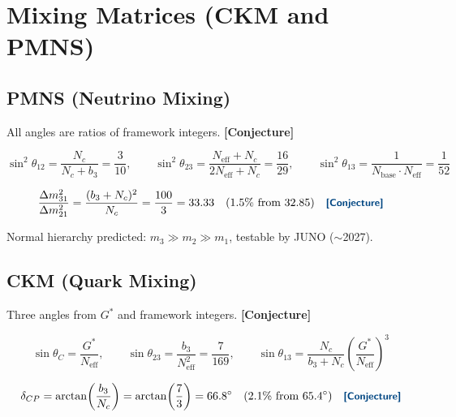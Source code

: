 \documentclass[12pt]{article}
\theoremstyle{definition}
\theoremstyle{remark}
\newcommand{\epi}[1]{\textnormal{{\small\sffamily\bfseries\color{ftdblue}[#1]}}}
\begin{document}
\section{Mixing Matrices (CKM and PMNS)}

\subsection{PMNS (Neutrino Mixing)}

\noindent All angles are ratios of framework integers. \epi{Conjecture}

\begin{equation}
\boxed{
\sin^2\!\theta_{12} = \frac{N_c}{N_c + b_3} = \frac{3}{10},\qquad
\sin^2\!\theta_{23} = \frac{N_\text{eff}+N_c}{2N_\text{eff}+N_c} = \frac{16}{29},\qquad
\sin^2\!\theta_{13} = \frac{1}{N_\text{base}\cdot N_\text{eff}} = \frac{1}{52}
}
\end{equation}

\begin{equation}
\frac{\Delta m^2_{31}}{\Delta m^2_{21}} = \frac{(b_3+N_c)^2}{N_c} = \frac{100}{3} = 33.33
\quad\text{(1.5\% from 32.85)} \quad\epi{Conjecture}
\end{equation}

\noindent Normal hierarchy predicted: $m_3 \gg m_2 \gg m_1$, testable by JUNO ($\sim$2027).

\subsection{CKM (Quark Mixing)}

\noindent Three angles from $G^{*}$ and framework integers. \epi{Conjecture}

\begin{equation}
\boxed{
\sin\theta_C = \frac{G^{*}}{N_\text{eff}},\qquad
\sin\theta_{23} = \frac{b_3}{N_\text{eff}^2} = \frac{7}{169},\qquad
\sin\theta_{13} = \frac{N_c}{b_3+N_c}\!\left(\frac{G^{*}}{N_\text{eff}}\right)^{\!3}
}
\end{equation}

\begin{equation}
\delta_{CP} = \arctan\!\left(\frac{b_3}{N_c}\right) = \arctan\!\left(\frac{7}{3}\right) = 66.8^\circ
\quad\text{(2.1\% from $65.4^\circ$)} \quad\epi{Conjecture}
\end{equation}
\end{document}
